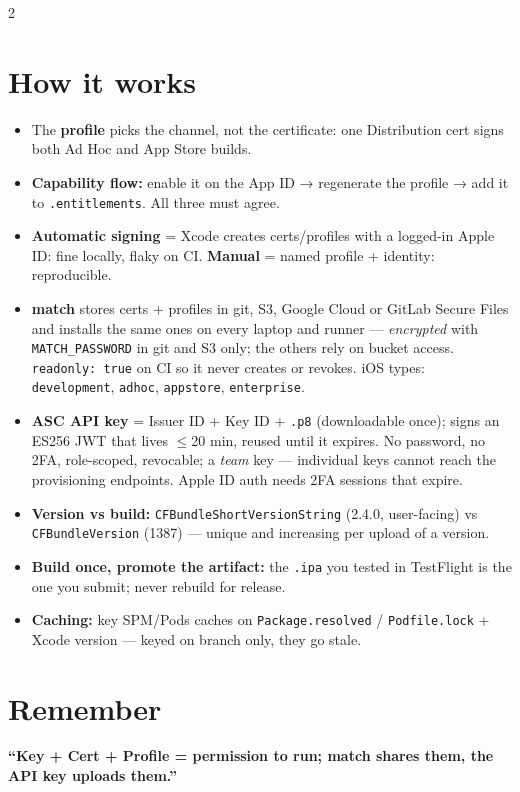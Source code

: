 \documentclass[8pt]{extarticle}
\begin{document}
\begin{multicols}{2}
\section{How it works}
\begin{itemize}
  \item The \textbf{profile} picks the channel, not the certificate: one Distribution
        cert signs both Ad Hoc and App Store builds.
  \item \textbf{Capability flow:} enable it on the App ID → regenerate the profile → add it
        to \texttt{.entitlements}. All three must agree.
  \item \textbf{Automatic signing} = Xcode creates certs/profiles with a logged-in Apple ID:
        fine locally, flaky on CI. \textbf{Manual} = named profile + identity: reproducible.
  \item \textbf{match} stores certs + profiles in git, S3, Google Cloud or GitLab Secure Files
        and installs the same ones on every laptop and runner — \emph{encrypted} with
        \texttt{MATCH\_PASSWORD} in git and S3 only; the others rely on bucket access.
        \texttt{readonly: true} on CI so it never creates or revokes. iOS types:
        \texttt{development}, \texttt{adhoc}, \texttt{appstore}, \texttt{enterprise}.
  \item \textbf{ASC API key} = Issuer ID + Key ID + \texttt{.p8} (downloadable once); signs an
        ES256 JWT that lives $\le$20 min, reused until it expires. No password, no 2FA,
        role-scoped, revocable; a \emph{team} key — individual keys cannot reach the
        provisioning endpoints. Apple ID auth needs 2FA sessions that expire\unverified.
  \item \textbf{Version vs build:} \texttt{CFBundleShortVersionString} (2.4.0, user-facing)
        vs \texttt{CFBundleVersion} (1387) — unique and increasing per upload of a
        version\unverified.
  \item \textbf{Build once, promote the artifact:} the \texttt{.ipa} you tested in TestFlight
        is the one you submit; never rebuild for release.
  \item \textbf{Caching:} key SPM/Pods caches on \texttt{Package.resolved} /
        \texttt{Podfile.lock} + Xcode version — keyed on branch only, they go stale.
\end{itemize}

\section{Remember}
\textbf{``Key + Cert + Profile = permission to run; match shares them, the API key
uploads them.''}


\end{multicols}
\end{document}

